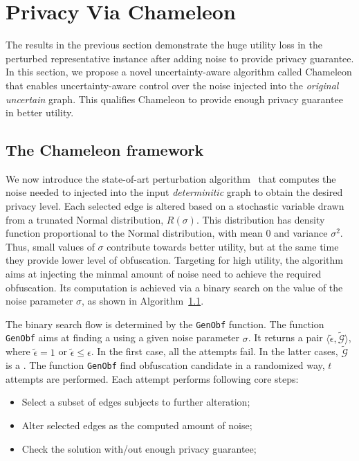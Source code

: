 \section{Privacy Via Chameleon}
The results in the previous section demonstrate the huge utility loss in the perturbed representative instance after adding noise to provide privacy guarantee. In this section, we propose a novel uncertainty-aware algorithm called Chameleon that enables uncertainty-aware control over the noise injected into the \emph{original uncertain} graph. This qualifies Chameleon to provide enough privacy guarantee in better utility. 

\subsection{The Chameleon framework}

We now introduce the state-of-art perturbation algorithm~\cite{Boldi_Injecting_2012} that computes the noise needed to injected into the input \emph{determinitic} graph to obtain the desired privacy level. Each selected edge is altered based on a stochastic variable drawn from a trunated Normal distribution, $R(\sigma)$. This distribution has density function proportional to the Normal distribution, with mean $0$ and variance $\sigma^2$. Thus, small values of $\sigma$ contribute towards better utility, but at the same time they provide lower level of obfuscation. Targeting for high utility, the algorithm aims at injecting the minmal amount of noise need to achieve the required obfuscation. Its computation is achieved via a binary search on the value of the noise parameter $\sigma$, as shown in Algorithm~\ref{}. 

The binary search flow is determined by the \texttt{GenObf} function. 
The function \texttt{GenObf} aims at finding a {\keobf} using a given noise parameter $\sigma$.
It returns a pair $\langle \tilde{\epsilon}, \tilde{\mathcal{G}} \rangle$, where $\tilde{\epsilon} =1$ or $\tilde{\epsilon} \le \epsilon$. In the first case, all the attempts fail. In the latter cases, $\tilde{\mathcal{G}}$ is a {\keobf}. 
The function \texttt{GenObf} find obfuscation candidate in a randomized way, $t$ attempts are performed. Each attempt performs following core steps:
\begin{itemize}
    \item{Select a subset of edges subjects to further alteration;}
    \item{Alter selected edges as the computed amount of noise;}
    \item{Check the solution with/out enough privacy guarantee;}
\end{itemize}


